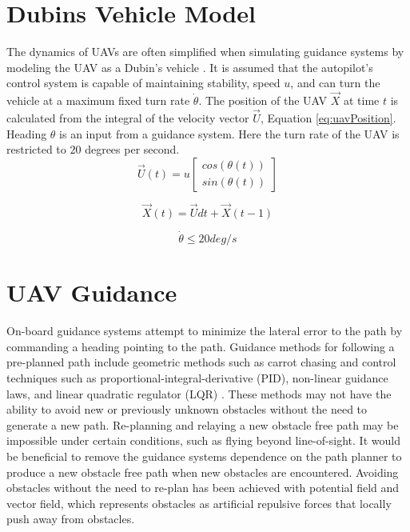\documentclass[numbered,pdftex]{ohio-etd}
\begin{document}
\section{Dubins Vehicle Model}
The dynamics of UAVs are often simplified when simulating guidance systems by modeling the UAV as a Dubin's vehicle \cite{frew_cooperative_2007,griffiths_vector_2006,nelson_cooperative_2005,nelson_vector_2006,nelson_vector_2007}. It is assumed that the autopilot's control system is capable of maintaining stability, speed $u$, and can turn the vehicle at a maximum fixed turn rate $\dot{\theta}$. The position of the UAV $\overrightarrow{X}$ at time $t$ is calculated from the integral of the velocity vector $\overrightarrow{U}$, Equation \ref{eq:uavPosition}. Heading $\theta$ is an input from a guidance system. Here the turn rate of the UAV is restricted to $20$ degrees per second.
\begin{equation}
\label{eq:uavVelocity}
\overrightarrow{U}(t) = u \begin{bmatrix}
cos(\theta(t)) \\
sin(\theta(t))
\end{bmatrix}
\end{equation}


\begin{equation}
\label{eq:uavPosition}
\overrightarrow{X}(t) = \overrightarrow{U}dt + \overrightarrow{X}(t-1)
\end{equation}


\begin{equation}
\label{turnRate}
\dot{\theta} \leq 20 deg/s
\end{equation}


\section{UAV Guidance}
On-board guidance systems attempt to minimize the lateral error to the path by commanding a heading pointing to the path. Guidance methods for following a pre-planned path include geometric methods such as carrot chasing \cite{manjunath_application_2016} and control techniques such as proportional-integral-derivative (PID), non-linear guidance laws, and linear quadratic regulator (LQR) \cite{sujit_unmanned_2014}. These methods may not have the ability to avoid new or previously unknown obstacles without the need to generate a new path. Re-planning and relaying a new obstacle free path may be impossible under certain conditions, such as flying beyond line-of-sight. It would be beneficial to remove the guidance systems dependence on the path planner to produce a new obstacle free path when new obstacles are encountered. Avoiding obstacles without the need to re-plan has been achieved with potential field and vector field, which represents obstacles as artificial repulsive forces that locally push away from obstacles. 
\end{document}
